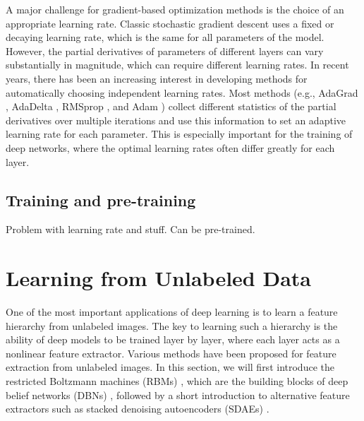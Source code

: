 A major challenge for gradient-based optimization methods is the choice of an
appropriate learning rate. Classic stochastic gradient descent \citep{LeCun1998}
uses a fixed or decaying learning rate, which is the same for all parameters of
the model. However, the partial derivatives of parameters of different layers
can vary substantially in magnitude, which can require different learning rates.
In recent years, there has been an increasing interest in developing methods for
automatically choosing independent learning rates. Most methods (e.g., AdaGrad
\citep{duchi2011}, AdaDelta \citep{zeiler2012}, RMSprop \citep{dauphin2015}, and
Adam \citep{kingma2014}) collect different statistics of the partial derivatives
over multiple iterations and use this information to set an adaptive learning
rate for each parameter. This is especially important for the training of deep
networks, where the optimal learning rates often differ greatly for each layer.


\subsection{Training and pre-training}

Problem with learning rate and stuff. Can be pre-trained.

\section{Learning from Unlabeled Data}


One of the most important applications of deep learning is to learn a feature
hierarchy from unlabeled images. The key to learning such a hierarchy is the
ability of deep models to be trained layer by layer, where each layer acts as a
nonlinear feature extractor. Various methods have been proposed for feature
extraction from unlabeled images. In this section, we will first introduce the
restricted Boltzmann machines (RBMs) \citep{freund1992,hinton2010}, which are the
building blocks of deep belief networks (DBNs) \citep{Hinton2006b}, followed by
a short introduction to alternative feature extractors such as stacked denoising
autoencoders (SDAEs) \citep{vincent2010}.


